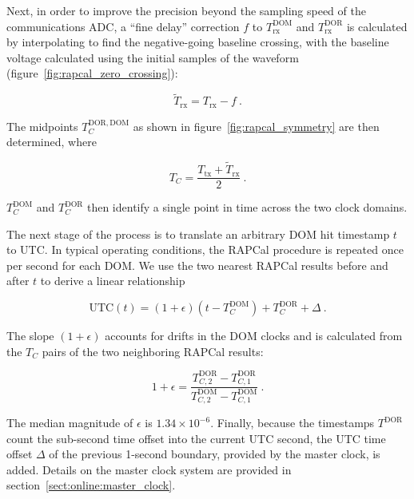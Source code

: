 Next, in order to improve the precision beyond the sampling speed of the
communications ADC, a ``fine delay'' correction $f$ to $T_{\mathrm{rx}}^{\mathrm{DOM}}$ and
$T_{\mathrm{rx}}^{\mathrm{DOR}}$ is calculated by interpolating 
to find the negative-going baseline crossing, with the baseline voltage
calculated using the initial samples of the waveform (figure~\ref{fig:rapcal_zero_crossing}):

\begin{equation}
  \tilde{T}_{\mathrm{rx}} = T_{\mathrm{rx}} - f\ .
\end{equation}


\noindent The midpoints $T_C^{\mathrm{DOR,DOM}}$ as shown in
figure~\ref{fig:rapcal_symmetry} are then determined, where

\begin{equation}
  T_C =  \frac{T_{\mathrm{tx}} + \tilde{T}_{\mathrm{rx}}}{2}\ .
\end{equation}

\noindent $T_C^{\mathrm{DOM}}$ and $T_C^{\mathrm{DOR}}$ then identify a
single point in time across the two clock domains.

The next stage of the process is to translate an arbitrary DOM hit timestamp
$t$ to UTC.  In typical operating conditions, the RAPCal procedure
is repeated once per second for each DOM.  We use the two nearest RAPCal
results before and after $t$ to derive a linear relationship

\begin{equation}
  \mathrm{UTC}(t) = (1+\epsilon)(t - T_C^{\mathrm{DOM}}) +
  T_C^{\mathrm{DOR}} + \Delta\ .
\end{equation}

\noindent The slope $(1+\epsilon)$ accounts for drifts in the DOM
clocks and is calculated from the $T_C$ pairs of the two neighboring RAPCal
results: 

\begin{equation}
  1+\epsilon = \frac{T_{C,2}^{\mathrm{DOR}} -
    T_{C,1}^{\mathrm{DOR}}}{T_{C,2}^{\mathrm{DOM}} -
    T_{C,1}^{\mathrm{DOM}}}\ .
\end{equation}

\noindent The median magnitude of $\epsilon$ is $1.34 \times 10^{-6}$.
Finally, because the timestamps $T^{\mathrm{DOR}}$ count the sub-second
time offset into the current UTC second, the UTC time offset $\Delta$ of the previous
1-second boundary, provided by the master clock, is added.  Details on the
master clock system are provided in section~\ref{sect:online:master_clock}.

